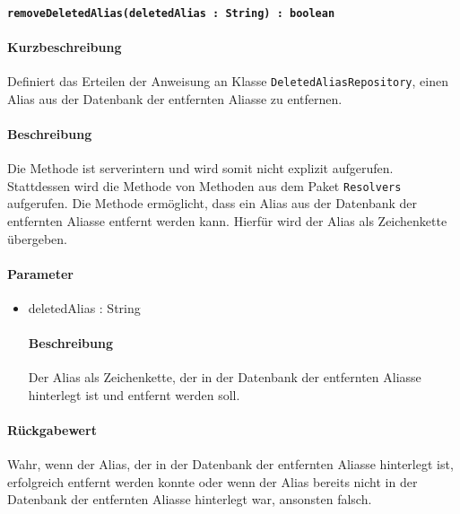 \paragraph*{\texttt{removeDeletedAlias(deletedAlias : String) : boolean}}%
\paragraph*{Kurzbeschreibung}
Definiert das Erteilen der Anweisung an Klasse \texttt{DeletedAliasRepository}, einen Alias aus der Datenbank der entfernten Aliasse zu entfernen.
\paragraph*{Beschreibung}
Die Methode ist serverintern und wird somit nicht explizit aufgerufen.
Stattdessen wird die Methode von Methoden aus dem Paket \texttt{Resolvers} aufgerufen.
Die Methode ermöglicht, dass ein Alias aus der Datenbank der entfernten Aliasse entfernt werden kann.
Hierfür wird der Alias als Zeichenkette übergeben.
\paragraph*{Parameter}
\begin{itemize}
    \item deletedAlias : String
    		\paragraph*{Beschreibung}
    		Der Alias als Zeichenkette, der in der Datenbank der entfernten Aliasse hinterlegt ist und entfernt werden soll.
\end{itemize}
\paragraph*{Rückgabewert}
Wahr, wenn der Alias, der in der Datenbank der entfernten Aliasse hinterlegt ist, erfolgreich entfernt werden konnte oder wenn der Alias bereits nicht in der Datenbank der entfernten Aliasse hinterlegt war, ansonsten falsch.
